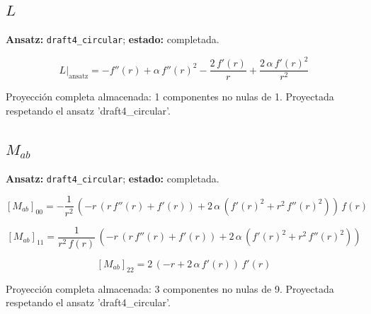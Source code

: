 \documentclass[11pt]{article}
\begin{document}
\subsection*{$ L $}
\textbf{Ansatz:} \texttt{draft4\_circular}; \textbf{estado:} completada.\par
\begin{dmath*}[breakdepth={5}]
L\big|_{\mathrm{ansatz}} = -f''\!\left(r\right) + \alpha\,{f''\!\left(r\right)}^{2} - \frac{2\,f'\!\left(r\right)}{r} + \frac{2\,\alpha\,{f'\!\left(r\right)}^{2}}{{r}^{2}}
\end{dmath*}
\par\smallskip
Proyección completa almacenada: 1 componentes no nulas de 1. Proyectada respetando el ansatz 'draft4\_circular'.\par\medskip
{}
\subsection*{$ M_{ab} $}
\textbf{Ansatz:} \texttt{draft4\_circular}; \textbf{estado:} completada.\par
\begin{dmath*}[breakdepth={5}]
\left[M_{ab}\right]_{00} = -\frac{1}{{r}^{2}}\,\left(-r\,\left(r\,f''\!\left(r\right) + f'\!\left(r\right)\right) + 2\,\alpha\,\left({f'\!\left(r\right)}^{2} + {r}^{2}\,{f''\!\left(r\right)}^{2}\right)\right)\,f\!\left(r\right)
\end{dmath*}
\par\smallskip
\begin{dmath*}[breakdepth={5}]
\left[M_{ab}\right]_{11} = \frac{1}{{r}^{2}\,f\!\left(r\right)}\,\left(-r\,\left(r\,f''\!\left(r\right) + f'\!\left(r\right)\right) + 2\,\alpha\,\left({f'\!\left(r\right)}^{2} + {r}^{2}\,{f''\!\left(r\right)}^{2}\right)\right)
\end{dmath*}
\par\smallskip
\begin{dmath*}[breakdepth={5}]
\left[M_{ab}\right]_{22} = 2\,\left(-r + 2\,\alpha\,f'\!\left(r\right)\right)\,f'\!\left(r\right)
\end{dmath*}
\par\smallskip
Proyección completa almacenada: 3 componentes no nulas de 9. Proyectada respetando el ansatz 'draft4\_circular'.\par\medskip
{}
\end{document}
